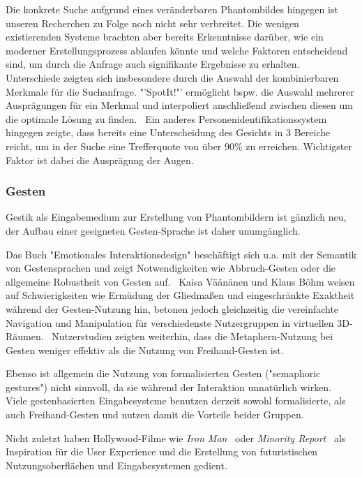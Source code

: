 \documentclass{sigchi-ext}
\begin{document}
Die konkrete Suche aufgrund eines veränderbaren Phantombildes hingegen ist unseren Recherchen zu Folge noch nicht sehr verbreitet. Die wenigen existierenden Systeme brachten aber bereits Erkenntnisse darüber, wie ein moderner Erstellungsprozess ablaufen könnte und welche Faktoren entscheidend sind, um durch die Anfrage auch signifikante Ergebnisse zu erhalten.
Unterschiede zeigten sich insbesondere durch die Auswahl der
kombinierbaren Merkmale für die Suchanfrage. "'SpotIt!"' ermöglicht
bspw. die Auswahl mehrerer Ausprägungen für ein Merkmal und interpoliert anschließend zwischen diesen um die optimale Lösung zu finden.~\cite{brunelli1996} Ein anderes Personenidentifikationssystem hingegen zeigte, dass bereits eine Unterscheidung des Gesichts in 3 Bereiche reicht, um in der Suche eine Trefferquote von über 90\% zu erreichen. Wichtigster Faktor ist dabei die Ausprägung der Augen. ~\cite{bobulski2012}

\subsubsection{Gesten}
Gestik als Eingabemedium zur Erstellung von Phantombildern ist gänzlich neu, der Aufbau einer geeigneten Gesten-Sprache ist daher unumgänglich. 

Das Buch "Emotionales Interaktionsdesign" beschäftigt sich
 u.a. mit der Semantik von Gestensprachen und zeigt Notwendigkeiten wie Abbruch-Gesten oder die allgemeine Robustheit von Gesten auf.~\cite{Dorau11} Kaisa Väänänen und Klaus Böhm weisen auf Schwierigkeiten wie Ermüdung der Gliedmaßen und eingeschränkte Exaktheit während der Gesten-Nutzung hin, betonen jedoch gleichzeitig die vereinfachte Navigation und Manipulation für verschiedenste Nutzergruppen in virtuellen 3D-Räumen.~\cite{vrs:book}
Nutzerstudien zeigten weiterhin, dass die
Metaphern-Nutzung bei Gesten weniger effektiv als die Nutzung von
Freihand-Gesten ist.~\cite{3dinteraction:book}

Ebenso ist allgemein die Nutzung von formalisierten Gesten ("semaphoric gestures") nicht sinnvoll, da sie während der Interaktion unnatürlich wirken.~\cite{Quek:2002:MHD:568513.568514, Wexelblat:1997:RCG:647590.728557}
Viele gestenbasierten Eingabesysteme benutzen derzeit sowohl formalisierte, als auch
Freihand-Gesten und nutzen damit die Vorteile beider Gruppen.~\cite{3dinteraction:book}

Nicht zuletzt haben Hollywood-Filme wie \textit{Iron Man}~\cite{ironman:movie} oder \textit{Minority Report}~\cite{minorityreport:movie} als Inspiration für die User Experience und die Erstellung von futuristischen Nutzungsoberflächen und Eingabesystemen gedient.
\end{document}
